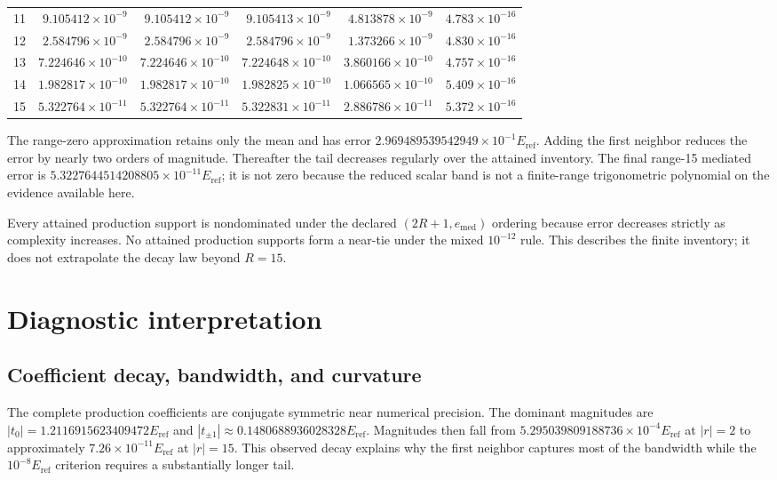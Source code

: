 \documentclass[11pt]{article}
\newcommand{\eref}{E_{\mathrm{ref}}}
\begin{document}
\begin{longtable}{r@{\quad}rrrrr}
11 & $9.105412\times10^{-9}$ & $9.105412\times10^{-9}$ & $9.105413\times10^{-9}$ & $4.813878\times10^{-9}$ & $4.783\times10^{-16}$ \\
12 & $2.584796\times10^{-9}$ & $2.584796\times10^{-9}$ & $2.584796\times10^{-9}$ & $1.373266\times10^{-9}$ & $4.830\times10^{-16}$ \\
13 & $7.224646\times10^{-10}$ & $7.224646\times10^{-10}$ & $7.224648\times10^{-10}$ & $3.860166\times10^{-10}$ & $4.757\times10^{-16}$ \\
14 & $1.982817\times10^{-10}$ & $1.982817\times10^{-10}$ & $1.982825\times10^{-10}$ & $1.066565\times10^{-10}$ & $5.409\times10^{-16}$ \\
15 & $5.322764\times10^{-11}$ & $5.322764\times10^{-11}$ & $5.322831\times10^{-11}$ & $2.886786\times10^{-11}$ & $5.372\times10^{-16}$ \\
\bottomrule
\end{longtable}
\endgroup

The range-zero approximation retains only the mean and has error
$2.969489539542949\times10^{-1}\eref$.  Adding the first neighbor reduces the error by
nearly two orders of magnitude.  Thereafter the tail decreases regularly over the
attained inventory.  The final range-15 mediated error is
$5.3227644514208805\times10^{-11}\eref$; it is not zero because the reduced scalar band
is not a finite-range trigonometric polynomial on the evidence available here.

Every attained production support is nondominated under the declared
$(2R+1,e_{\mathrm{med}})$ ordering because error decreases strictly as complexity
increases.  No attained production supports form a near-tie under the mixed
$10^{-12}$ rule.  This describes the finite inventory; it does not extrapolate the decay
law beyond $R=15$.

\section{Diagnostic interpretation}

\subsection{Coefficient decay, bandwidth, and curvature}

The complete production coefficients are conjugate symmetric near numerical precision.
The dominant magnitudes are
$|t_0|=1.2116915623409472\eref$ and
$|t_{\pm1}|\approx0.1480688936028328\eref$.  Magnitudes then fall from
$5.295039809188736\times10^{-4}\eref$ at $|r|=2$ to approximately
$7.26\times10^{-11}\eref$ at $|r|=15$.  This observed decay explains why the first
neighbor captures most of the bandwidth while the $10^{-8}\eref$ criterion requires a
substantially longer tail.
\end{document}
